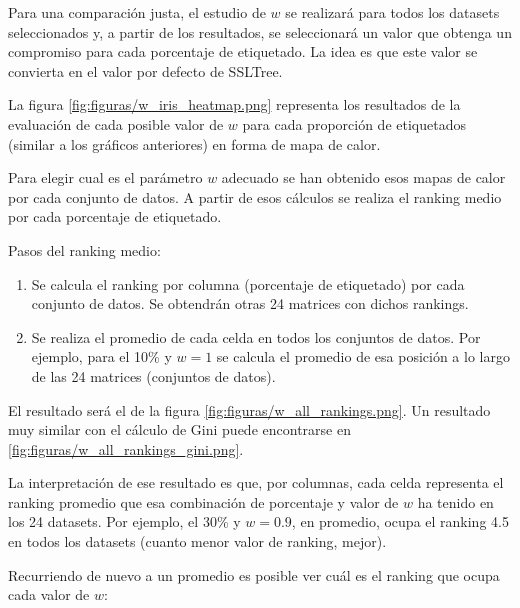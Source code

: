 Para una comparación justa, el estudio de $w$ se realizará para todos los datasets seleccionados y, a partir de los resultados, se seleccionará un valor que obtenga un compromiso para cada porcentaje de etiquetado. La idea es que este valor se convierta en el valor por defecto de SSLTree.


La figura \ref{fig:figuras/w_iris_heatmap.png} representa los resultados de la evaluación de cada posible valor de $w$ para cada proporción de etiquetados (similar a los gráficos anteriores) en forma de mapa de calor.

Para elegir cual es el parámetro $w$ adecuado se han obtenido esos mapas de calor por cada conjunto de datos. A partir de esos cálculos se realiza el ranking medio por cada porcentaje de etiquetado.

Pasos del ranking medio:

\begin{enumerate}
    \item Se calcula el ranking por columna (porcentaje de etiquetado) por cada conjunto de datos. Se obtendrán otras 24 matrices con dichos rankings.
    \item Se realiza el promedio de cada celda en todos los conjuntos de datos. Por ejemplo, para el 10\% y $w = 1$ se calcula el promedio de esa posición a lo largo de las 24 matrices (conjuntos de datos).
\end{enumerate}

El resultado será el de la figura \ref{fig:figuras/w_all_rankings.png}. Un resultado muy similar con el cálculo de Gini puede encontrarse en \ref{fig:figuras/w_all_rankings_gini.png}.


La interpretación de ese resultado es que, por columnas, cada celda representa el ranking promedio que esa combinación de porcentaje y valor de $w$ ha tenido en los 24 datasets. Por ejemplo, el 30\% y $w = 0.9$, en promedio, ocupa el ranking 4.5 en todos los datasets (cuanto menor valor de ranking, mejor).

Recurriendo de nuevo a un promedio es posible ver cuál es el ranking que ocupa cada valor de $w$:

